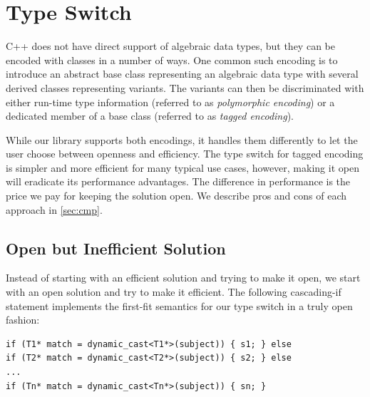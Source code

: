 \section{Type Switch}
\label{sec:copc}

C++ does not have direct support of algebraic data types, but they can be 
encoded with classes in a number of ways. One common such encoding is to 
introduce an abstract base class representing an algebraic data type with 
several derived classes representing variants. The variants can then be 
discriminated with either run-time type information (referred to as 
\emph{polymorphic encoding}) or a dedicated member of a base class 
(referred to  as \emph{tagged encoding}).

While our library supports both encodings, it handles them differently to let 
the user choose between openness and efficiency. The type switch for tagged 
encoding is simpler and more efficient for many typical use cases, however, 
making it open will eradicate its performance advantages. The difference in 
performance is the price we pay for keeping the solution open. We describe pros 
and cons of each approach in \textsection\ref{sec:cmp}.




\subsection{Open but Inefficient Solution}
\label{sec:poets}

Instead of starting with an efficient solution and trying to make it open, we 
start with an open solution and try to make it efficient. The following 
cascading-if statement implements the first-fit semantics for our type switch in 
a truly open fashion:

\begin{lstlisting}
if (T1* match = dynamic_cast<T1*>(subject)) { s1; } else
if (T2* match = dynamic_cast<T2*>(subject)) { s2; } else
...
if (Tn* match = dynamic_cast<Tn*>(subject)) { sn; }
\end{lstlisting}

